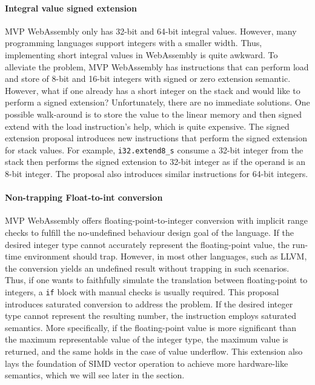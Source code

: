 \paragraph{Integral value signed extension}
MVP WebAssembly only has 32-bit and 64-bit integral values. However, many programming languages support integers with a smaller width. Thus, implementing short integral values in WebAssembly is quite awkward. To alleviate the problem, MVP WebAssembly has instructions that can perform load and store of 8-bit and 16-bit integers with signed or zero extension semantic. However, what if one already has a short integer on the stack and would like to perform a signed extension?  Unfortunately, there are no immediate solutions. One possible walk-around is to store the value to the linear memory and then signed extend with the load instruction's help, which is quite expensive. The signed extension proposal introduces new instructions that perform the signed extension for stack values. For example, \texttt{i32.extend8\_s} consume a 32-bit integer from the stack then performs the signed extension to 32-bit integer as if the operand is an 8-bit integer. The proposal also introduces similar instructions for 64-bit integers.

\paragraph{Non-trapping Float-to-int conversion}
MVP WebAssembly offers floating-point-to-integer conversion with implicit range checks to fulfill the no-undefined behaviour design goal of the language. If the desired integer type cannot accurately represent the floating-point value, the run-time environment should trap. However, in most other languages, such as LLVM, the conversion yields an undefined result without trapping in such scenarios. Thus, if one wants to faithfully simulate the translation between floating-point to integers, a \texttt{if} block with manual checks is usually required. This proposal introduces saturated conversion to address the problem. If the desired integer type cannot represent the resulting number, the instruction employs saturated semantics. More specifically, if the floating-point value is more significant than the maximum representable value of the integer type, the maximum value is returned, and the same holds in the case of value underflow. This extension also lays  the foundation of SIMD vector operation to achieve more hardware-like semantics, which we will see later in the section. 

